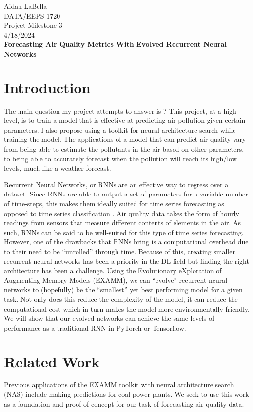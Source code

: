 \documentclass[12pt]{article}
\begin{document}
\noindent
Aidan LaBella \\
DATA/EEPS 1720 \\
Project Milestone 3\\
4/18/2024 \\

\textbf{Forecasting Air Quality Metrics With Evolved Recurrent Neural Networks}

\section{Introduction}
The main question my project attempts to answer is ? This project, at a high level, is to train a model that is effective at predicting air pollution given certain parameters. I also propose using a toolkit for neural architecture search while training the model. The applications of a model that can predict air quality vary from being able to estimate the pollutants in the air based on other parameters, to being able to accurately forecast when the pollution will reach its high/low levels, much like a weather forecast. 

Recurrent Neural Networks, or RNNs are an effective way to regress over a dataset. Since RNNs are able to output a set of parameters for a variable number of time-steps, this makes them ideally suited for time series forecasting as opposed to time series classification \cite{yang2022predictive}. Air quality data takes the form of hourly readings from sensors that measure different contents of elements in the air. As such, RNNs can be said to be well-suited for this type of time series forecasting. However, one of the drawbacks that RNNs bring is a computational overhead due to their need to be “unrolled” through time. Because of this, creating smaller recurrent neural networks has been a priority in the DL field but finding the right architecture has been a challenge. Using the Evolutionary eXploration of Augmenting Memory Models (EXAMM)\cite{ororbia_investigating_2019}, we can “evolve'' recurrent neural networks to (hopefully) be the “smallest” yet best performing model for a given task. Not only does this reduce the complexity of the model, it can reduce the computational cost which in turn makes the model more environmentally friendly. We will show that our evolved networks can achieve the same levels of performance as a traditional RNN in PyTorch or Tensorflow.

\section{Related Work}
Previous applications of the EXAMM\cite{ororbia_investigating_2019} toolkit with neural architecture search (NAS) include making predictions for coal power plants\cite{kaufmann_evolving_2019}. We seek to use this work as a foundation and proof-of-concept for our task of forecasting air quality data. 
\end{document}
